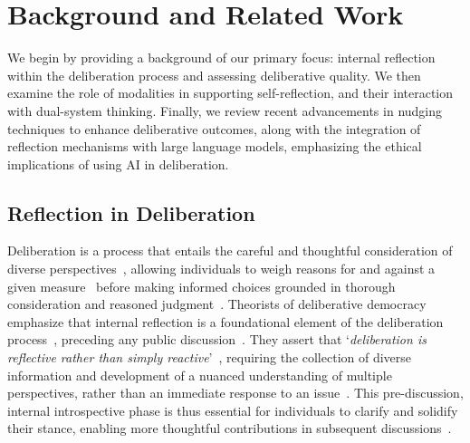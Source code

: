 \section{Background and Related Work} 
We begin by providing a background of our primary focus: internal reflection within the deliberation process and assessing deliberative quality. We then examine the role of modalities in supporting self-reflection, and their interaction with dual-system thinking. Finally, we review recent advancements in nudging techniques to enhance deliberative outcomes, along with the integration of reflection mechanisms with large language models, emphasizing the ethical implications of using AI in deliberation.

\subsection{Reflection in Deliberation}
\label{sec: reflection background}
Deliberation is a process that entails the careful and thoughtful consideration of diverse perspectives~\cite{davies2013online, goodin2003does, aristotle1984complete, hobbes1946}, allowing individuals to weigh reasons for and against a given measure~\cite{goodin2003does, oxford} before making informed choices grounded in thorough consideration and reasoned judgment~\cite{christiano2009debates}. Theorists of deliberative democracy emphasize that internal reflection is a foundational element of the deliberation process~\cite{muradova2021seeing, dryzek2002deliberative, goodin2000democratic, chambers2003deliberative}, preceding any public discussion~\cite{goodin2003does}. They assert that `\textit{deliberation is reflective rather than simply reactive}'~\cite{bohman2000public, dahlberg2001computer, janssen2004online}, requiring the collection of diverse information and development of a nuanced understanding of multiple perspectives, rather than an immediate response to an issue~\cite{davies2009online}. This pre-discussion, internal introspective phase is thus essential for individuals to clarify and solidify their stance, enabling more thoughtful contributions in subsequent discussions~\cite{goodin2003does, holdo2020meta}. 

